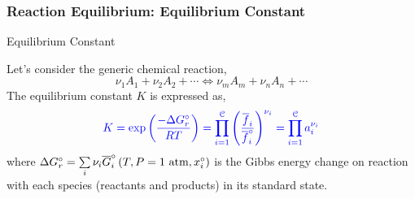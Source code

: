 \documentclass[10pt,compress,handout,unknownkeysallowed]{beamer}
\begin{document}
\begin{frame}
  \frametitle{Reaction Equilibrium: Equilibrium Constant}
      \begin{block}{\begin{center}Equilibrium Constant\end{center}}
            Let's consider the generic chemical reaction,
               \begin{displaymath}
                   \nu_{1} A_{1} + \nu_{2} A_{2}  + \cdots  \Longleftrightarrow \nu_{m} A_{m} + \nu_{n} A_{n} + \cdots  
               \end{displaymath} 
            The equilibrium constant $K$ is expressed as,
               \begin{displaymath}
                  \blue{K = \exp\left(\frc{-\Delta G_{r}^{\circ}}{RT}\right) = \prod\limits_{i=1}^{\mathcal{C}}\left(\frc{\overline{f}_{i}}{\overline{f}_{i}^{\circ}}\right)^{\nu_{i}} = \prod\limits_{i=1}^{\mathcal{C}} a_{i}^{\nu_{i}}}
               \end{displaymath}
               where $\Delta G_{r}^{\circ}=\summation[\nu_{i}\overline{G}_{i}^{\circ}\left(T,P=1\text{ atm}, x_{i}^{\circ}\right)]{i}{}$ is the Gibbs energy change on reaction with each species (reactants and products) in its standard state.
      \end{block}

\end{frame}
\end{document}
